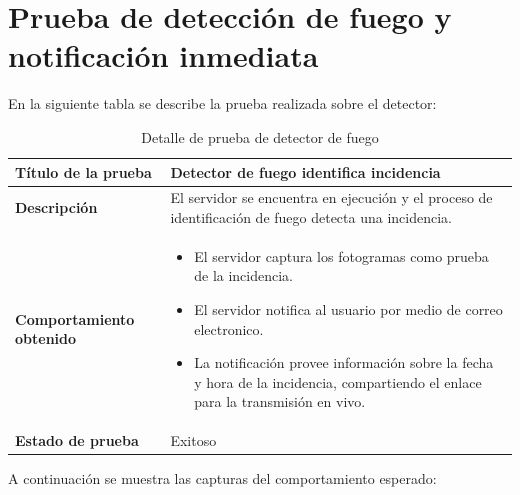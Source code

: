 \section{Prueba de detección de fuego y notificación inmediata}

En la siguiente tabla se describe la prueba realizada sobre el detector:\\

\begin{table}[H]
    \caption{Detalle de prueba de detector de fuego}
    \begin{center}
        \begin{tabular}{|>{\centering}p{}|m{}<{\centering}|} 
            \hline
            \textbf{Título de la prueba} & Detector de fuego identifica incidencia \\
            \hline
            \textbf{Descripción} & El servidor se encuentra en ejecución y el proceso de identificación de fuego detecta una incidencia.\\
            \hline
            \textbf{Comportamiento obtenido} & 
            \begin{itemize}
                \item El servidor captura los fotogramas como prueba de la incidencia.
                \item El servidor notifica al usuario por medio de correo electronico.
                \item La notificación provee información sobre la fecha y hora de la incidencia, compartiendo el enlace para la transmisión en vivo.
            \end{itemize} \\ 
            \hline
            \textbf{Estado de prueba} & Exitoso \\
            \hline
        \end{tabular}
    \end{center}
\end{table}

A continuación se muestra las capturas del comportamiento esperado:

